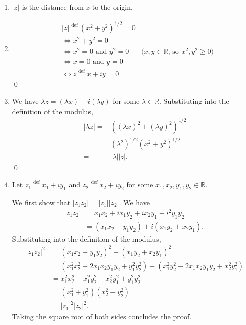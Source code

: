\documentclass[oneside]{article}
\newcommand\abs[1]{\left|#1\right|}
\newcommand\defeq{\overset{\mathrm{def}}{=}}
\newcommand\bbR{\mathbb{R}}
\begin{document}
  \begin{enumerate}[label=\textbf{(\alph*)}]
    \item $\abs{z}$ is the distance from $z$ to the origin.

    \item \begin{align*}
      & \abs{z} \defeq \left(x^2 + y^2\right)^{1/2} = 0 \\
      &\iff
        x^2 + y^2 = 0 \\
      &\iff
        x^2 = 0\text{ and }y^2 = 0 &
        \text{($x, y \in \bbR$, so $x^2, y^2 \geq 0$)} \\
      &\iff
        x = 0\text{ and }y = 0 \\
      &\iff
        z \defeq x + iy = 0
    \end{align*} \qed

    \item We have $\lambda z = (\lambda x) + i (\lambda y)$ for some
      $\lambda \in \bbR$. Substituting into the definition of the modulus,
      \begin{align*}
        \abs{\lambda z} =
        &\left((\lambda x)^2 + (\lambda y)^2\right)^{1/2} \\
        = & \left(\lambda^2\right)^{1/2}\left(x^2 + y^2\right)^{1/2} \\
        = & \abs{\lambda}\abs{z} \text{.}
      \end{align*}
      \qed

    \item Let $z_1 \defeq x_1 + iy_1$ and $z_2 \defeq x_2 + iy_2$ for some
      $x_1, x_2, y_1, y_2 \in \bbR$.

      We first show that $\abs{z_1z_2} = \abs{z_1}\abs{z_2}$. We have
      \begin{align*}
        z_1z_2
        & = x_1x_2 + ix_1y_2 + ix_2y_1 + i^2y_1y_2 \\
        & = (x_1x_2 - y_1y_2) + i(x_1y_2 + x_2y_1)\text{.}
      \end{align*}
      Substituting into the definition of the modulus,
      \begin{align*}
        \abs{z_1z_2}^2 &= (x_1x_2 - y_1y_2)^2+(x_1y_2 + x_2y_1)^2 \\
        &= \left(x_1^2x_2^2 - 2x_1x_2y_1y_2 + y_1^2y_2^2\right)
          + \left(x_1^2y_2^2 + 2x_1x_2y_1y_2 + x_2^2y_1^2\right) \\
        &= x_1^2x_2^2 + x_1^2y_2^2 + x_2^2y_1^2 + y_1^2y_2^2 \\
        &= \left(x_1^2 + y_1^2\right)\left(x_2^2 + y_2^2\right) \\
        &= \abs{z_1}^2\abs{z_2}^2 \text{.}
      \end{align*}
      Taking the square root of both sides concludes the proof.


\end{enumerate}
\end{document}
